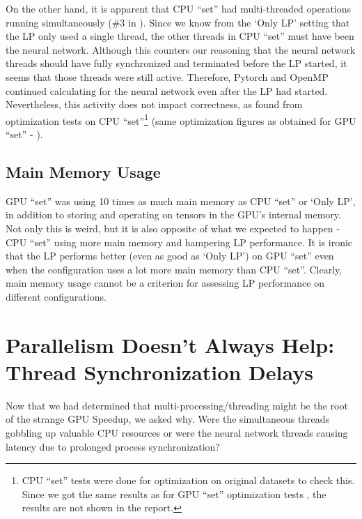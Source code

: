 On the other hand, it is apparent that CPU ``set'' had multi-threaded operations running simultaneously (\#3 in ). Since we know from the `Only LP' setting that the LP only used a single thread, the other threads in CPU ``set'' must have been the neural network. Although this counters our reasoning that the neural network threads should have fully synchronized and terminated before the LP started, it seems that those threads were still active. Therefore, Pytorch and OpenMP continued calculating for the neural network even after the LP had started. Nevertheless, this activity does not impact correctness, as found from optimization tests on CPU ``set''\footnote{CPU ``set'' tests were done for optimization on original datasets to check this. Since we got the same results as for GPU ``set'' optimization tests , the results are not shown in the report.} (same optimization figures as obtained for GPU ``set'' - ).

\subsection{Main Memory Usage}
GPU ``set'' was using 10 times as much main memory as CPU ``set'' or `Only LP', in addition to storing and operating on tensors in the GPU's internal memory. Not only this is weird, but it is also opposite of what we expected to happen - CPU ``set'' using more main memory and hampering LP performance. It is ironic that the LP performs better (even as good as `Only LP') on GPU ``set'' even when the configuration uses a lot more main memory than CPU ``set''. Clearly, main memory usage cannot be a criterion for assessing LP performance on different configurations.

\section{Parallelism Doesn't Always Help: Thread Synchronization Delays} \label{app:Parallelism Doesn't Always Help}
Now that we had determined that multi-processing/threading might be the root of the strange GPU Speedup, we asked why. Were the simultaneous threads gobbling up valuable CPU resources or were the neural network threads causing latency due to prolonged process synchronization?

